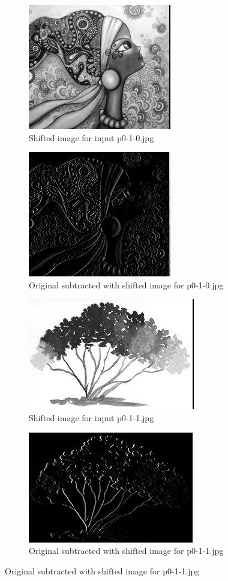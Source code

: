 \begin{enumerate}[label=\emph{\alph*)}]
\begin{figure}[h!]
\centering
\begin{subfigure}{0.5\textwidth}
  \centering
  \includegraphics[width=0.5\linewidth]{../output/p0-4-c-0.jpg}
  \caption{Shifted image for input p0-1-0.jpg}
\end{subfigure}%
\begin{subfigure}{0.5\textwidth}
  \centering
  \includegraphics[width=0.5\linewidth]{../output/p0-4-c-1.jpg}
  \caption{Original subtracted with shifted image for p0-1-0.jpg}
\end{subfigure}
\begin{subfigure}{0.5\textwidth}
  \centering
  \includegraphics[width=0.5\linewidth]{../output/p0-4-c-2.jpg}
  \caption{Shifted image for input p0-1-1.jpg}
\end{subfigure}%
\begin{subfigure}{0.5\textwidth}
  \centering
  \includegraphics[width=0.5\linewidth]{../output/p0-4-c-3.jpg}
  \caption{Original subtracted with shifted image for p0-1-1.jpg}
\end{subfigure}


\end{figure}
\end{enumerate}
